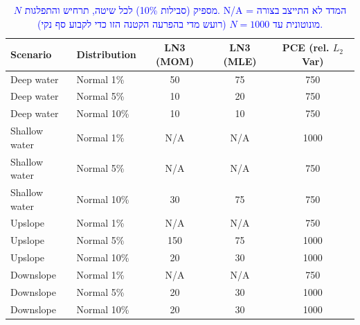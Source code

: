 \documentclass[12pt,a4paper]{article}
\DeclareRobustCommand{\aiedit}[1]{\textcolor{blue}{#1}}
\begin{document}
\begin{table}[H]
  \centering
  \caption{\aiedit{$N$ מספיק (סבילות 10\%{}) לכל שיטה, תרחיש והתפלגות. \textenglish{N/A} = המדד
           לא התייצב בצורה מונוטונית עד $N=1000$ (רועש מדי בהפרעה הקטנה הזו כדי לקבוע סף נקי).}}
  \label{tab:sufficient_n_full}
  \begin{english}
  \begin{tabular}{llccc}
    \toprule
    Scenario & Distribution & LN3 (MOM) & LN3 (MLE) & PCE (rel. $L_2$ Var) \\
    \midrule
    Deep water    & Normal 1\%  & 50  & 75  & 750 \\
    Deep water    & Normal 5\%  & 10  & 20  & 750 \\
    Deep water    & Normal 10\% & 10  & 10  & 750 \\
    \midrule
    Shallow water & Normal 1\%  & N/A & N/A & 1000 \\
    Shallow water & Normal 5\%  & N/A & N/A & 750  \\
    Shallow water & Normal 10\% & 30  & 75  & 750  \\
    \midrule
    Upslope       & Normal 1\%  & N/A & N/A & 750  \\
    Upslope       & Normal 5\%  & 150 & 75  & 1000 \\
    Upslope       & Normal 10\% & 20  & 30  & 1000 \\
    \midrule
    Downslope     & Normal 1\%  & N/A & N/A & 750  \\
    Downslope     & Normal 5\%  & 20  & 30  & 1000 \\
    Downslope     & Normal 10\% & 20  & 30  & 1000 \\
    \bottomrule
  \end{tabular}
  \end{english}
\end{table}
\end{document}
